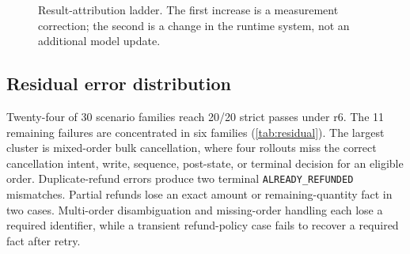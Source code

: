 \documentclass[11pt]{article}
\begin{document}
\begin{figure}[t]
\centering
{}
\caption{Result-attribution ladder. The first increase is a measurement correction; the second is a change in the runtime system, not an additional model update.}
\label{fig:ladder}
\end{figure}

\subsection{Residual error distribution}

Twenty-four of 30 scenario families reach 20/20 strict passes under r6. The 11 remaining failures are concentrated in six families (\cref{tab:residual}). The largest cluster is mixed-order bulk cancellation, where four rollouts miss the correct cancellation intent, write, sequence, post-state, or terminal decision for an eligible order. Duplicate-refund errors produce two terminal \texttt{ALREADY\_REFUNDED} mismatches. Partial refunds lose an exact amount or remaining-quantity fact in two cases. Multi-order disambiguation and missing-order handling each lose a required identifier, while a transient refund-policy case fails to recover a required fact after retry.
\end{document}
